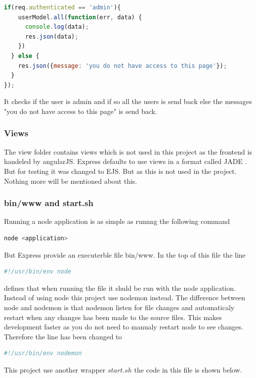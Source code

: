 \documentclass[a4paper,12pt,english]{article}
\begin{document}
\begin{lstlisting}[language=javascript]
  if(req.authenticated == 'admin'){
    userModel.all(function(err, data) {
      console.log(data);
      res.json(data);
    })
  } else {
    res.json({message: 'you do not have access to this page'});
  }
});
\end{lstlisting}
It checks if the user is admin and if so all the users is send back else the messages "you do not have access to this page" is send back.

\subsubsection{Views}
The view folder contains views which is not used in this project as the frontend is handeled by angularJS. Express defaults to use views in a format called JADE . But for testing it was changed to EJS. But as this is not used in the project. Nothing more will be mentioned about this.

\subsubsection{bin/www and start.sh}
Running a node application is as simple as runnng the following command

\begin{lstlisting}[language=javascript] 
node <application>
\end{lstlisting}

But Express provide an executerble file bin/www. In the top of this file the line

\begin{lstlisting}[language=javascript] 
#!/usr/bin/env node
\end{lstlisting}
defines that when running the file it shuld be run with the node application. Instead of using node this project use nodemon instead. The difference between node and nodemon is that nodemon listen for file changes and automaticaly restart when any changes has been made to the source files. This makes development faster as you do not need to manualy restart node to see changes. Therefore the line has been changed to 

\begin{lstlisting}[language=javascript]
#!/usr/bin/env nodemon
\end{lstlisting}

This project use another wrapper $start.sh$ the code in this file is shown below.
\end{document}
